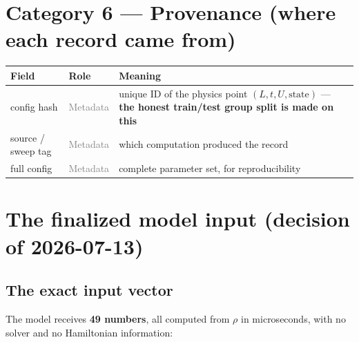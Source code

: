 \documentclass[11pt]{article}
\newcommand{\meta}{\textcolor{gray}{Metadata}}
\begin{document}
\section{Category 6 --- Provenance (where each record came from)}
\begin{center}
\begin{tabular}{@{}llp{8.6cm}@{}}
\toprule
Field & Role & Meaning \\ \midrule
config hash   & \meta{} & unique ID of the physics point
  $(L,t,U,\text{state})$ --- \textbf{the honest train/test group split is
  made on this} \\
source / sweep tag & \meta{} & which computation produced the record \\
full config   & \meta{} & complete parameter set, for reproducibility \\
\bottomrule
\end{tabular}
\end{center}

\section{The finalized model input (decision of 2026-07-13)}\label{sec:final}

\subsection{The exact input vector}
The model receives \textbf{49 numbers}, all computed from $\rho$ in
microseconds, with no solver and no Hamiltonian information:
\end{document}
